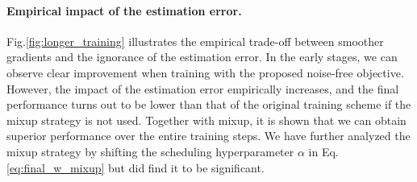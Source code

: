 \documentclass[letterpaper]{article} %
\begin{document}
\paragraph{Empirical impact of the estimation error.}
Fig.\ref{fig:longer_training} illustrates the empirical trade-off between smoother gradients and the ignorance of the estimation error. In the early stages, we can observe clear improvement when training with the proposed noise-free objective. However, the impact of the estimation error empirically increases, and the final performance turns out to be lower than that of the original training scheme if the mixup strategy is not used. Together with mixup, it is shown that we can obtain superior performance over the entire training steps. We have further analyzed the mixup strategy by shifting the scheduling hyperparameter $\alpha$ in Eq.\eqref{eq:final_w_mixup} but did find it to be significant.
%
%
%
%
\end{document}

